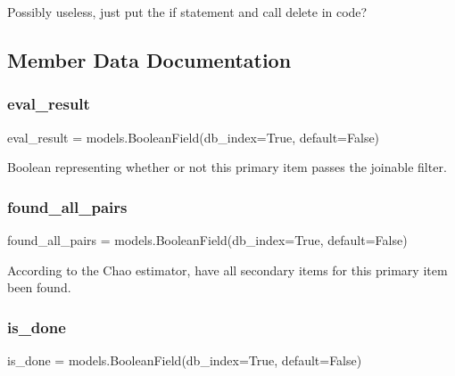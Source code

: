 Possibly useless, just put the if statement and call delete in code? 



\subsection{Member Data Documentation}
\mbox{\label{classjoinapp_1_1models_1_1items_1_1_primary_item_ad3d4511625ae766aa7b27b78372da59a}} 
\subsubsection{\texorpdfstring{eval\_result}{eval\_result}}
{\footnotesize\ttfamily eval\+\_\+result = models.\+Boolean\+Field(db\+\_\+index=True, default=False)\hspace{0.3cm}{\ttfamily [static]}}



Boolean representing whether or not this primary item passes the joinable filter. 

\mbox{\label{classjoinapp_1_1models_1_1items_1_1_primary_item_a1360f28af178672145c001e52ae799b3}} 
\subsubsection{\texorpdfstring{found\_all\_pairs}{found\_all\_pairs}}
{\footnotesize\ttfamily found\+\_\+all\+\_\+pairs = models.\+Boolean\+Field(db\+\_\+index=True, default=False)\hspace{0.3cm}{\ttfamily [static]}}



According to the Chao estimator, have all secondary items for this primary item been found. 

\mbox{\label{classjoinapp_1_1models_1_1items_1_1_primary_item_adb552c356f3128144a850af54619b087}} 
\subsubsection{\texorpdfstring{is\_done}{is\_done}}
{\footnotesize\ttfamily is\+\_\+done = models.\+Boolean\+Field(db\+\_\+index=True, default=False)\hspace{0.3cm}{\ttfamily [static]}}



